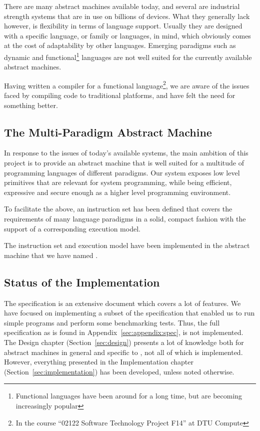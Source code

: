 There are many abstract machines available today, and several are industrial
strength systems that are in use on billions of devices. What they generally
lack however, is flexibility in terms of language support. Usually they are
designed with a specific language, or family or languages, in mind, which
obviously comes at the cost of adaptability by other languages. Emerging
paradigms such as dynamic and functional\footnote{Functional languages have been
  around for a long time, but are becoming increasingly popular} languages are
not well suited for the currently available abstract machines.

Having written a compiler for a functional language\footnote{In the course
  ``02122 Software Technology Project F14'' at DTU Compute}, we are aware of the
issues faced by compiling code to traditional platforms, and have felt the need
for something better.

\subsection{The Multi-Paradigm Abstract Machine}

In response to the issues of today's available systems, the main ambition of
this project is to provide an abstract machine that is well suited for a
multitude of programming languages of different paradigms. Our system exposes
low level primitives that are relevant for system programming, while being
efficient, expressive and secure enough as a higher level programming
environment.

To facilitate the above, an instruction set has been defined that covers the
requirements of many language paradigms in a solid, compact fashion with the
support of a corresponding execution model.

The instruction set and execution model have been implemented in the abstract
machine that we have named \thename{}.

\subsection{Status of the Implementation}

The \thename{} specification is an extensive document which covers a lot of
features. We have focused on implementing a subset of the specification that
enabled us to run simple programs and perform some benchmarking tests. Thus, the
full specification as is found in Appendix~\ref{sec:appendix:spec}, is not
implemented. The Design chapter (Section~\ref{sec:design}) presents a lot of
knowledge both for abstract machines in general and specific to \thename{}, not
all of which is implemented. However, everything presented in the Implementation
chapter (Section~\ref{sec:implementation}) has been developed, unless noted
otherwise.

